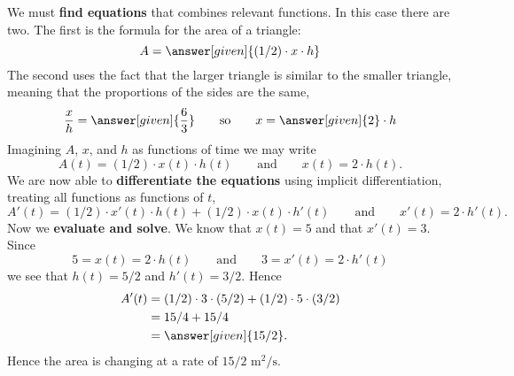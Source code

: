 \documentclass{ximera}
\begin{document}
\begin{example}
\begin{explanation}
    We must \textbf{find equations} that combines relevant
    functions. In this case there are two. The first is the formula
    for the area of a triangle:
    \[
    A = \answer[given]{(1/2) \cdot x \cdot h}
    \]
    The second uses the fact that the larger triangle is similar to
    the smaller triangle, meaning that the proportions of the sides
    are the same,
    \[
    \frac{x}{h} = \answer[given]{\frac{6}{3}}\qquad\text{so}\qquad x =
    \answer[given]{2}\cdot h
    \]
    Imagining $A$, $x$, and $h$ as functions of time we may write
    \[
    A(t) = (1/2) \cdot x(t) \cdot h(t) \qquad\text{and}\qquad x(t) =
    2\cdot h(t).
    \]
    We are now able to \textbf{differentiate the equations} using
    implicit differentiation, treating all functions as functions of
    $t$,
    \[
    A'(t) = (1/2) \cdot x'(t) \cdot h(t) +  (1/2) \cdot x(t) \cdot h'(t)\qquad\text{and}\qquad x'(t) = 2\cdot h'(t).
    \]
    Now we \textbf{evaluate and solve}. We
    know that $x(t) = 5$ and that $x'(t) = 3$. Since
    \[
    5=x(t) = 2\cdot h(t)\qquad\text{and}\qquad 3=x'(t)= 2\cdot h'(t)
    \]
    we see that $h(t) = 5/2$ and $h'(t) = 3/2$. Hence
    \begin{align*}
      A'(t) &= (1/2) \cdot 3 \cdot (5/2) + (1/2) \cdot 5 \cdot (3/2)\\
      &= 15/4 + 15/4\\
      &= \answer[given]{15/2}.
    \end{align*}
    Hence the area is changing at a rate of $15/2$
    $\text{m}^2/\text{s}$.
  \end{explanation}
\end{example}
\end{document}

